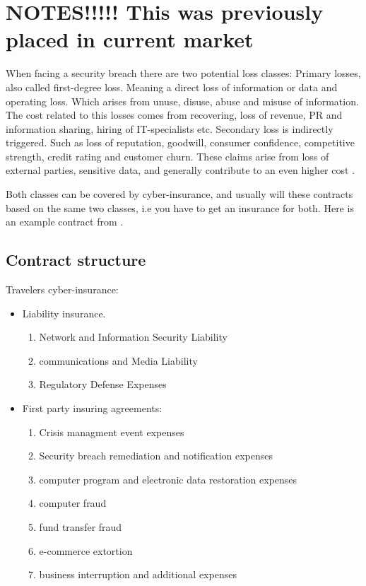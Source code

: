 \section{NOTES!!!!! This was previously placed in current market }
When facing a security breach there are two potential loss classes:
Primary losses, also called first-degree loss. Meaning a direct loss of information or data and operating loss. 
Which arises from unuse, disuse, abuse and misuse of information.
 The cost related to this losses comes from recovering, loss of revenue, 
 PR and information sharing, hiring of IT-specialists etc. 
Secondary loss is indirectly triggered. Such as loss of reputation, goodwill, 
consumer confidence, competitive strength, credit rating and customer churn. 
These claims arise from loss of external parties, sensitive data, 
and generally contribute to an even higher cost \cite{bandyopadhyay2009managers}.

Both classes can be covered by cyber-insurance, and usually will these contracts based on the same two classes, i.e you have to get an insurance for both. 
Here is an example contract from \cite{travelers}.
\subsection{Contract structure}
Travelers cyber-insurance:
\begin{itemize}
\item Liability insurance. \begin{enumerate}
\item Network and Information Security Liability
\item communications and Media Liability
\item Regulatory Defense Expenses
\end{enumerate}
\item First party insuring agreements: \begin{enumerate}
\item Crisis managment event expenses
\item Security breach remediation and notification expenses
\item computer program and electronic data restoration expenses
\item computer fraud
\item fund transfer fraud
\item e-commerce extortion
\item business interruption and additional expenses
\end{enumerate}
\end{itemize}
